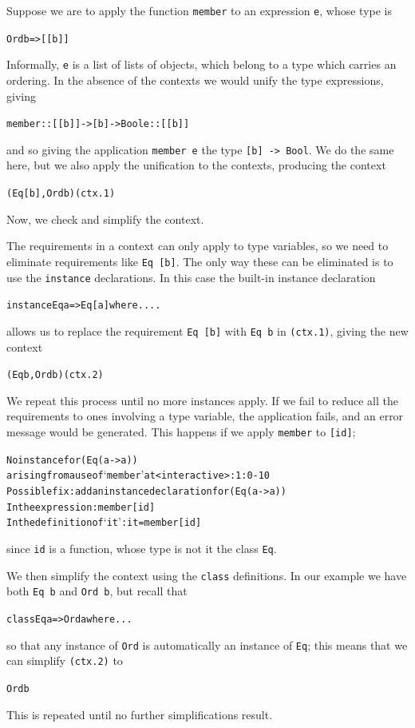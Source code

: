 Suppose we are to apply the function \texttt{member} to an expression \texttt{e},
whose type is 
\begin{alltt}
Ord b => [[b]]
\end{alltt}
Informally, \texttt{e} is a list of lists of objects, which belong to
a type which carries an
ordering. In the absence of the contexts we would unify the type
expressions, giving
\begin{alltt}
member :: [[b]] -> [b] -> Bool \hspace*{2cm} e :: [[b]]
\end{alltt}
and so giving the application \texttt{member e}
the type \texttt{[b] -> Bool}. We do the same here,
but we also apply the unification to the contexts, producing the context
\begin{alltt}
(Eq [b] , Ord b)\hfill(ctx.1)
\end{alltt}
Now, we check and simplify the context.
\begin{titemize}
\item The requirements in a context can only apply to type variables, so we need to eliminate
requirements like \texttt{Eq [b]}. The only way these can be eliminated is to use
the \texttt{instance} declarations. In this case the built-in instance
declaration
\begin{alltt}
instance Eq a => Eq [a] where ....
\end{alltt}
allows us to replace the requirement \texttt{Eq [b]} with \texttt{Eq b} in \texttt{(ctx.1)},
giving the new context
\begin{alltt}
(Eq b , Ord b)\hfill(ctx.2)
\end{alltt}
We repeat this process until no more instances apply.
\itempar
If we fail to reduce all the requirements to ones involving a type
variable, the application fails, and an error message would be generated. This
happens if we apply \texttt{member} to \texttt{[id]}; 
\begin{alltt}
    No instance for (Eq (a -> a))
      arising from a use of `member' at <interactive>:1:0-10
    Possible fix: add an instance declaration for (Eq (a -> a))
    In the expression: member [id]
    In the definition of `it': it = member [id]
\end{alltt}
since \texttt{id} is a function, whose type is not it the class \texttt{Eq}.

\item We then simplify the context using the \texttt{class} definitions. In our
example we have both \texttt{Eq b} and \texttt{Ord b}, but recall that
\begin{alltt}
class Eq a => Ord a where ...
\end{alltt}
so that any instance of \texttt{Ord} is automatically an instance of \texttt{Eq};
this means that we can simplify \texttt{(ctx.2)} to
\begin{alltt}
Ord b
\end{alltt}
This is repeated until no further simplifications result.
\end{titemize}
